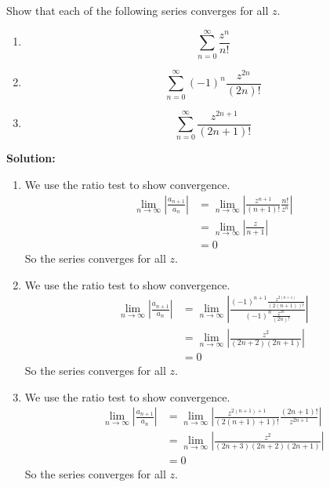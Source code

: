 \begin{example}
    Show that each of the following series converges for all $z$.
    \begin{enumerate}
        \item $$\sum_{n=0}^\infty\frac{z^{n}}{n!}$$
        \item $$\sum_{n=0}^\infty(-1)^n\frac{z^{2n}}{(2n)!}$$
        \item $$\sum_{n=0}^\infty\frac{z^{2n+1}}{(2n+1)!}$$
    \end{enumerate}
    \textbf{Solution:} \\
    \begin{enumerate}
        \item We use the ratio test to show convergence.
              \begin{align*}
                  \lim_{n \to \infty} \left|\frac{a_{n+1}}{a_n}\right| & = \lim_{n \to \infty} \left|\frac{z^{n+1}}{(n+1)!}\frac{n!}{z^n}\right| \\
                                                                       & = \lim_{n \to \infty} \left|\frac{z}{n+1}\right|                        \\
                                                                       & = 0
              \end{align*}
              So the series converges for all $z$.
        \item We use the ratio test to show convergence.
              \begin{align*}
                  \lim_{n \to \infty} \left|\frac{a_{n+1}}{a_n}\right| & = \lim_{n \to \infty} \left|\frac{(-1)^{n+1}\frac{z^{2(n+1)}}{(2(n+1))!}}{(-1)^n\frac{z^{2n}}{(2n)!}}\right| \\
                                                                       & = \lim_{n \to \infty} \left|\frac{z^2}{(2n+2)(2n+1)}\right|                                                  \\
                                                                       & = 0
              \end{align*}
              So the series converges for all $z$.
        \item We use the ratio test to show convergence.
              \begin{align*}
                  \lim_{n \to \infty} \left|\frac{a_{n+1}}{a_n}\right| & = \lim_{n \to \infty} \left|\frac{z^{2(n+1)+1}}{(2(n+1)+1)!}\frac{(2n+1)!}{z^{2n+1}}\right| \\
                                                                       & = \lim_{n \to \infty} \left|\frac{z^2}{(2n+3)(2n+2)(2n+1)}\right|                           \\
                                                                       & = 0
              \end{align*}
              So the series converges for all $z$. \qedhere
    \end{enumerate}

\end{example}